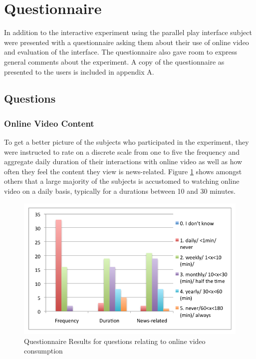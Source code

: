 
\section{Questionnaire} %
\label{sec:questionnaire}

In addition to the interactive experiment using the parallel play interface subject were presented with a questionnaire asking them about their use of online video and evaluation of the interface. The questionnaire also gave room to express general comments about the experiment. A copy of the questionnaire as presented to the users is included in appendix A.

\subsection{Questions} %
\label{sub:questions}

\subsubsection{Online Video Content}
To get a better picture of the subjects who participated in the experiment, they were instructed to rate on a discrete scale from one to five the frequency and aggregate daily duration of their interactions with online video as well as how often they feel the content they view is news-related. Figure \ref{fig:quest_consumption} shows amongst others that a large majority of the subjects is accustomed to watching online video on a daily basis, typically for a durations between 10 and 30 minutes.

\begin{figure}[htbp]
  \centering
    \includegraphics[width=.6\textwidth]{img/evaluation/quest_consumption}
  \caption{Questionnaire Results for questions relating to online video consumption}
  \label{fig:quest_consumption}
\end{figure}

